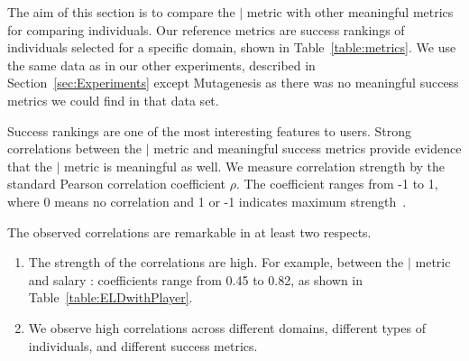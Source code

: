 {The aim of this section is to compare the $\mid$ metric with other meaningful metrics for comparing individuals. Our reference metrics are success rankings of individuals selected for a specific domain, shown in Table~\ref{table:metrics}. We use the same data as in our other experiments, described in Section~\ref{sec:Experiments} except Mutagenesis as there was no meaningful success metrics we could find in that data set. 

Success rankings are one of the most interesting features to users. Strong correlations between the $\mid$ metric and meaningful success metrics provide evidence that the $\mid$ metric is meaningful as well. We measure correlation strength by the standard Pearson correlation coefficient $\rho$. The coefficient ranges from -1 to 1, where 0 means no correlation and 1 or -1 indicates maximum strength~\citep{Fisher1921}.

The observed correlations are remarkable in at least two respects. 
\begin{enumerate}
\item The strength of the correlations are high. For example, between the $\mid$ metric and salary  : coefficients range from 0.45 to 0.82, as shown in Table~\ref{table:ELDwithPlayer}.
\item We observe high correlations across different domains, different types of individuals, and different success metrics. 
\end{enumerate}



\begin{table}[htbp]
	
	\centering
		\caption{Success metrics and their distributions.\label{table:metrics}}	
	\end{table}



}
